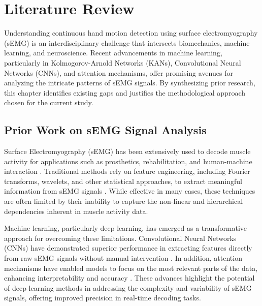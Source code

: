 \chapter{Literature Review}
\label{chap:lr}

Understanding continuous hand motion detection using surface electromyography (sEMG) is an interdisciplinary challenge that intersects biomechanics, machine learning, and neuroscience. Recent advancements in machine learning, particularly in Kolmogorov-Arnold Networks (KANs), Convolutional Neural Networks (CNNs), and attention mechanisms, offer promising avenues for analyzing the intricate patterns of sEMG signals. By synthesizing prior research, this chapter identifies existing gaps and justifies the methodological approach chosen for the current study.

\section{Prior Work on sEMG Signal Analysis}
Surface Electromyography (sEMG) has been extensively used to decode muscle activity for applications such as prosthetics, rehabilitation, and human-machine interaction \cite{farago2022review,simao2019review,zheng2022surface}. Traditional methods rely on feature engineering, including Fourier transforms, wavelets, and other statistical approaches, to extract meaningful information from sEMG signals \cite{oladazimi2012review}. While effective in many cases, these techniques are often limited by their inability to capture the non-linear and hierarchical dependencies inherent in muscle activity data.

Machine learning, particularly deep learning, has emerged as a transformative approach for overcoming these limitations. Convolutional Neural Networks (CNNs) have demonstrated superior performance in extracting features directly from raw sEMG signals without manual intervention \cite{ameri2019regression,briouza2021convolutional}. In addition, attention mechanisms have enabled models to focus on the most relevant parts of the data, enhancing interpretability and accuracy \cite{zhang2023lstm,lee2022explainable}. These advances highlight the potential of deep learning methods in addressing the complexity and variability of sEMG signals, offering improved precision in real-time decoding tasks.

